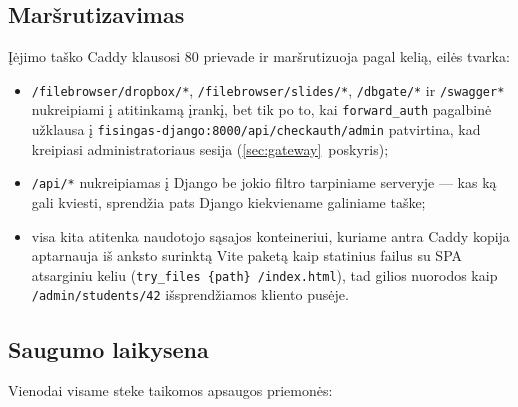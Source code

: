 \documentclass[11pt,a4paper]{article}
\newcommand{\code}[1]{\texttt{#1}}
\begin{document}
\subsection{Maršrutizavimas}

Įėjimo taško Caddy klausosi 80 prievade ir maršrutizuoja pagal kelią,
eilės tvarka:

\begin{itemize}
  \item \code{/filebrowser/dropbox/*}, \code{/filebrowser/slides/*},
        \code{/dbgate/*} ir \code{/swagger*} nukreipiami į atitinkamą
        įrankį, bet tik po to, kai \code{forward\_auth} pagalbinė
        užklausa į
        \code{fisingas-django:8000\allowbreak/api/checkauth/admin}
        patvirtina, kad kreipiasi administratoriaus sesija
        (\ref{sec:gateway}~poskyris);
  \item \code{/api/*} nukreipiamas į Django be jokio filtro tarpiniame
        serveryje — kas ką gali kviesti, sprendžia pats Django
        kiekviename galiniame taške;
  \item visa kita atitenka naudotojo sąsajos konteineriui, kuriame
        antra Caddy kopija aptarnauja iš anksto surinktą Vite paketą
        kaip statinius failus su SPA atsarginiu keliu
        (\code{try\_files \{path\} /index.html}), tad gilios nuorodos
        kaip \code{/admin/students/42} išsprendžiamos kliento pusėje.
\end{itemize}

\subsection{Saugumo laikysena}
\label{sec:posture}

Vienodai visame steke taikomos apsaugos priemonės:
\end{document}
